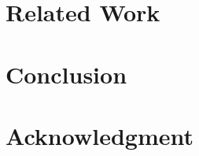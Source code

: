\documentclass[conference]{IEEEtran/IEEEtran}
\begin{document}
\section{Related Work}
\label{sec:Related Work}

\section{Conclusion}
\label{sec:Conclusion}



\section*{Acknowledgment}





\end{document}
